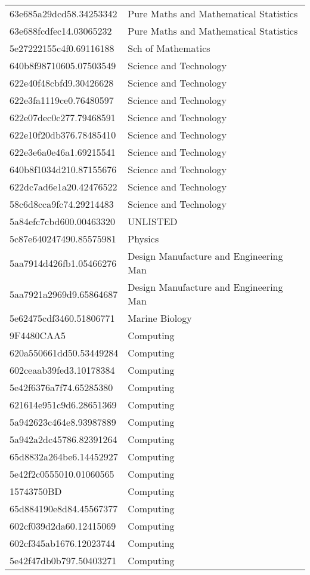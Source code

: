 \begin{tabular}{ll}
63e685a29dcd58.34253342 & Pure Maths and Mathematical Statistics \\
63e688fcdfec14.03065232 & Pure Maths and Mathematical Statistics \\
5e27222155c4f0.69116188 & Sch of Mathematics \\
640b8f98710605.07503549 & Science and Technology \\
622e40f48cbfd9.30426628 & Science and Technology \\
622e3fa1119ce0.76480597 & Science and Technology \\
622e07dec0c277.79468591 & Science and Technology \\
622e10f20db376.78485410 & Science and Technology \\
622e3e6a0e46a1.69215541 & Science and Technology \\
640b8f1034d210.87155676 & Science and Technology \\
622dc7ad6e1a20.42476522 & Science and Technology \\
58c6d8cca9fc74.29214483 & Science and Technology \\
5a84efc7cbd600.00463320 & UNLISTED \\
5c87e640247490.85575981 & Physics \\
5aa7914d426fb1.05466276 & Design Manufacture and Engineering Man \\
5aa7921a2969d9.65864687 & Design Manufacture and Engineering Man \\
5e62475cdf3460.51806771 & Marine Biology \\
9F4480CAA5 & Computing \\
620a550661dd50.53449284 & Computing \\
602ceaab39fed3.10178384 & Computing \\
5e42f6376a7f74.65285380 & Computing \\
621614e951c9d6.28651369 & Computing \\
5a942623c464e8.93987889 & Computing \\
5a942a2dc45786.82391264 & Computing \\
65d8832a264be6.14452927 & Computing \\
5e42f2c0555010.01060565 & Computing \\
15743750BD & Computing \\
65d884190e8d84.45567377 & Computing \\
602cf039d2da60.12415069 & Computing \\
602cf345ab1676.12023744 & Computing \\
5e42f47db0b797.50403271 & Computing \\

\end{tabular}
